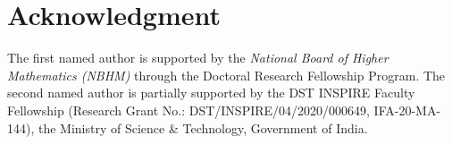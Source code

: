 \documentclass[12pt,reqno]{amsart}
\numberwithin{equation}{subsection}
\theoremstyle{definition}
\theoremstyle{theorem}
\begin{document}
 
 

 
 
 
 
 
\section*{Acknowledgment}
The first named author is supported by the \textit{National Board of Higher Mathematics (NBHM)} 
through the Doctoral Research Fellowship Program. 
The second named author is partially supported by the DST INSPIRE Faculty Fellowship (Research Grant No.: DST/INSPIRE/04/2020/000649, IFA-20-MA-144), the Ministry of Science \& Technology, 
Government of India. 


%
%
\end{document}
